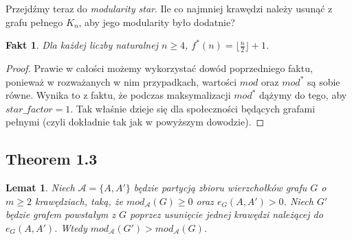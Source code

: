 \documentclass[letterpaper,12pt]{article}
\newtheorem{fact}{Fakt}
\newtheorem{lemma}{Lemat}
\begin{document}
  Przejdźmy teraz do \textit{modularity star}. Ile co najmniej krawędzi należy usunąć z grafu pełnego \(K_n\), aby jego modularity było dodatnie?

  \begin{fact}
    Dla każdej liczby naturalnej \(n \geq 4\), \(f^*(n) = \lfloor\frac{n}{2}\rfloor + 1\).
  \end{fact}

  \begin{proof}
    Prawie w całości możemy wykorzystać dowód poprzedniego faktu, ponieważ w rozważanych w nim przypadkach, wartości \(mod\) oraz \(mod^*\) są sobie równe. Wynika to z faktu, że podczas maksymalizacji \(mod^*\) dążymy do tego, aby \(star\_factor = 1\). Tak właśnie dzieje się dla społeczności będących grafami pełnymi (czyli dokładnie tak jak w powyższym dowodzie).

  \end{proof}

  \subsection{Theorem 1.3}
    \begin{lemma}
      Niech \(\mathcal{A}=\{A, A'\}\) będzie partycją zbioru wierzchołków grafu \(G\) o \(m \geq 2\) krawędziach, taką, że \(mod_{\mathcal{A}}(G) \geq 0\) oraz \(e_G(A, A') > 0\). Niech \(G'\) będzie grafem powstałym z \(G\) poprzez usunięcie jednej krawędzi należącej do \(e_G(A, A')\). Wtedy \(mod_{\mathcal{A}}(G') > mod_{\mathcal{A}}(G)\).
    \end{lemma}
\end{document}
